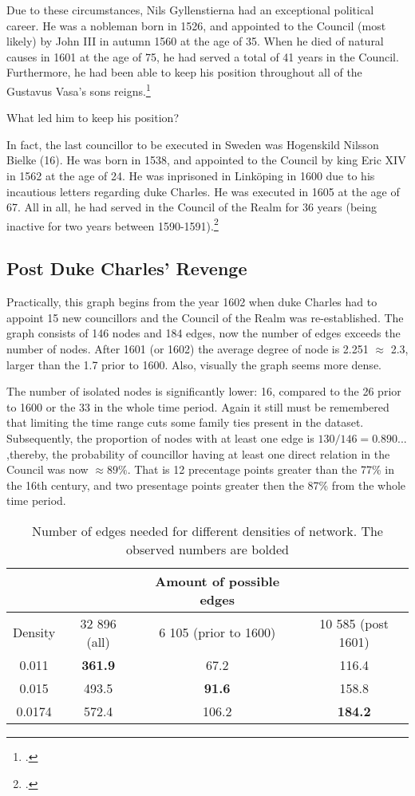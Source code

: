 Due to these circumstances, Nils Gyllenstierna had an exceptional political career. He was a nobleman born in 1526, and appointed to the Council (most likely) by John III in autumn 1560 at the age of 35. When he died of natural causes in 1601 at the age of 75, he had served a total of 41 years in the Council. Furthermore, he had been able to keep his position throughout all of the Gustavus Vasa's sons reigns.\footcite{councillorsDS} 

What led him to keep his position?

In fact, the last councillor to be executed in Sweden was Hogenskild Nilsson Bielke (16). He was born in 1538, and appointed to the Council by king Eric XIV in 1562 at the age of 24. He was inprisoned in Linköping in 1600 due to his incautious letters regarding duke Charles. He was executed in 1605 at the age of 67. All in all, he had served in the Council of the Realm for 36 years (being inactive for two years between 1590-1591).\footcites[p. 58.]{HakanenAKoskinen2017}{councillorsDS}

\subsection{Post Duke Charles' Revenge}
Practically, this graph begins from the year 1602 when duke Charles had to appoint 15 new councillors and the Council of the Realm was re-established. The graph consists of 146 nodes and 184 edges, now the number of edges exceeds the number of nodes. After 1601 (or 1602) the average degree of node is 2.251 $\approx$ 2.3, larger than the 1.7 prior to 1600. Also, visually the graph seems more dense. 

The number of isolated nodes is significantly lower: 16, compared to the 26 prior to 1600 or the 33 in the whole time period. Again it still must be remembered that limiting the time range cuts some family ties present in the dataset. Subsequently, the proportion of nodes with at least one edge is $130/146=0.890...$ ,thereby, the probability of councillor having at least one direct relation in the Council was now $\approx 89\%$. That is 12 precentage points greater than the 77\% in the 16th century, and two presentage points greater then the 87\% from the whole time period.

\begin{table}
	\caption[Number of edges needed for different densities of network]{Number of edges needed for different densities of network. The observed numbers are bolded}
	\label{edges}
	\begin{tabular}{cccc}
		\hline
		&& Amount of possible edges & \\
		\hline
		Density & 32 896 (all) & 6 105 (prior to 1600) & 10 585 (post 1601) \\
		\hline 
		0.011 & \textbf{361.9} & 67.2 & 116.4 \\
		\hline
		0.015 & 493.5 & \textbf{91.6} & 158.8 \\
		\hline
		0.0174 & 572.4 & 106.2 & \textbf{184.2}\\
		\hline
	\end{tabular}
\end{table}

